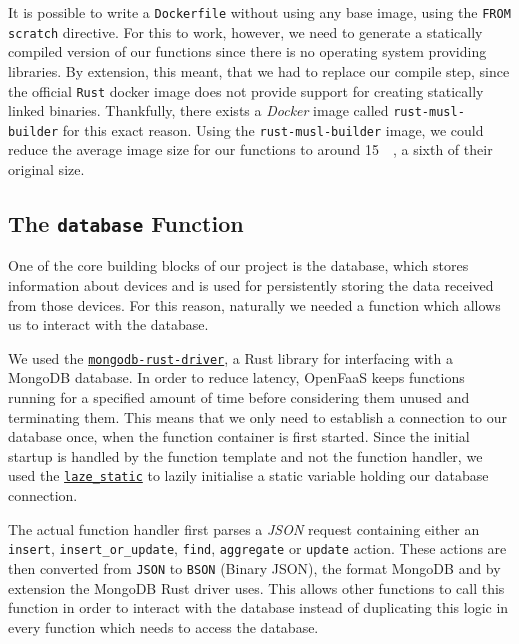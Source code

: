 It is possible to write a \texttt{Dockerfile} without using any base image, using the \texttt{FROM
scratch} directive. For this to work, however, we need to generate a statically compiled version of
our functions since there is no operating system providing libraries. By extension, this meant, that
we had to replace our compile step, since the official \texttt{Rust} docker image does not provide
support for creating statically linked binaries. Thankfully, there exists a \textit{Docker} image
called \texttt{rust-musl-builder} \cite{rust-musl-builder} for this exact reason. Using the
\texttt{rust-musl-builder} image, we could reduce the average image size for our functions to around
\SI{15}{\mega\byte}, a sixth of their original size.

\subsection{The \texttt{database} Function}

One of the core building blocks of our project is the database, which stores information about
devices and is used for persistently storing the data received from those devices. For this reason,
naturally we needed a function which allows us to interact with the database.

We used the \href{https://github.com/mongodb/mongo-rust-driver}{\texttt{mongodb-rust-driver}}, a
Rust library for interfacing with a MongoDB database. In order to reduce latency, OpenFaaS keeps
functions running for a specified amount of time before considering them unused and terminating
them. This means that we only need to establish a connection to our database once, when the function
container is first started. Since the initial startup is handled by the function template and not
the function handler, we used the
\href{https://github.com/rust-lang-nursery/lazy-static.rs}{\texttt{laze\_static}} to lazily
initialise a static variable holding our database connection.

The actual function handler first parses a \textit{JSON} request containing either an
\texttt{insert}, \texttt{insert\_or\_update}, \texttt{find}, \texttt{aggregate} or \texttt{update}
action. These actions are then converted from \texttt{JSON} to \texttt{BSON} (Binary JSON), the
format MongoDB and by extension the MongoDB Rust driver uses. This allows other functions to call
this function in order to interact with the database instead of duplicating this logic in every
function which needs to access the database.

